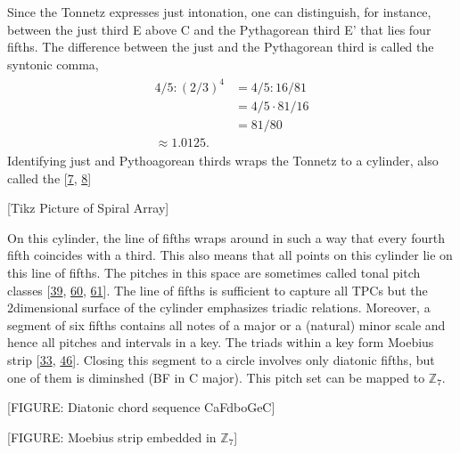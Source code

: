 \documentclass[letterpaper,10pt,english]{sphinxmanual}
\begin{document}
\sphinxAtStartPar
Since the Tonnetz expresses just intonation, one can distinguish, for
instance, between the just third E above C and the Pythagorean third E’
that lies four fifths. The difference between the just and the
Pythagorean third is called the syntonic comma,
\begin{equation*}
\begin{split}\begin{aligned}
    4/5 : (2/3)^4 &= 4/5 : 16/81\\
                                &= 4/5 \cdot 81/16\\
                                &= 81/80 \\
                                \approx 1.0125.\end{aligned}\end{split}
\end{equation*}
\sphinxAtStartPar
Identifying just and Pythoagorean thirds wraps the Tonnetz to a
cylinder, also called the 
{[}\hyperlink{cite.8_bibliography:id43}{7}, \hyperlink{cite.8_bibliography:id45}{8}{]}

\sphinxAtStartPar
{[}Tikz Picture of Spiral Array{]}

\sphinxAtStartPar
On this cylinder, the line of fifths wraps around in such a way that
every fourth fifth coincides with a third. This also means that all
points on this cylinder lie on this line of fifths. The pitches in this
space are sometimes called tonal pitch classes
{[}\hyperlink{cite.8_bibliography:id46}{39}, \hyperlink{cite.8_bibliography:id42}{60}, \hyperlink{cite.8_bibliography:id31}{61}{]}.
The line of
fifths is sufficient to capture all TPCs but the 2\sphinxhyphen{}dimensional surface
of the cylinder emphasizes triadic relations. Moreover, a segment of six
fifths contains all notes of a major or a (natural) minor scale and
hence all pitches and intervals in a key. The triads within a key form
Moebius strip {[}\hyperlink{cite.8_bibliography:id47}{33}, \hyperlink{cite.8_bibliography:id44}{46}{]}.
Closing this segment to a circle involves only diatonic fifths, but one of them is
diminshed (B\textendash{}F in C major). This pitch set can be mapped to
\(\mathbb Z_7\).

\sphinxAtStartPar
{[}FIGURE: Diatonic chord sequence C\sphinxhyphen{}a\sphinxhyphen{}F\sphinxhyphen{}d\sphinxhyphen{}bo\sphinxhyphen{}G\sphinxhyphen{}e\sphinxhyphen{}C{]}

\sphinxAtStartPar
{[}FIGURE: Moebius strip embedded in \(\mathbb Z_7\){]}
\end{document}
